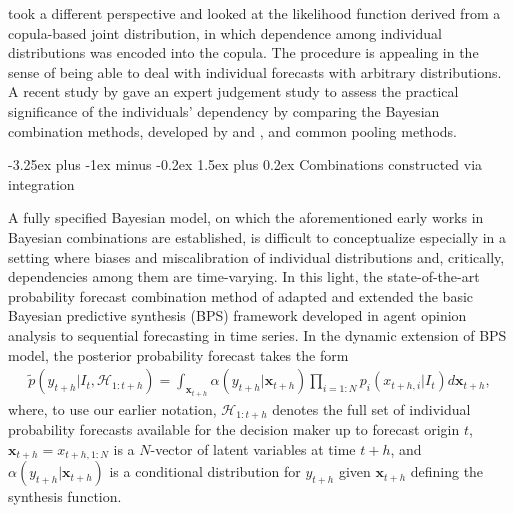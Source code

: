 \documentclass[11pt]{article}
\makeatletter
\renewcommand{\paragraph}{\@startsection{paragraph}{4}{0ex}%
   {-3.25ex plus -1ex minus -0.2ex}%
   {1.5ex plus 0.2ex}%
   {\normalfont\normalsize\bfseries}}
\makeatother
\begin{document}
\cite{Jouini1996-fe} took a different perspective and looked at the likelihood function derived from a copula-based joint distribution, in which dependence among individual distributions was encoded into the copula. The procedure is appealing in the sense of being able to deal with individual forecasts with arbitrary distributions. A recent study by \cite{Wilson2017-ct} gave an expert judgement study to assess the practical significance of the individuals' dependency by comparing the Bayesian combination methods, developed by \cite{Winkler1981-bn} and \cite{Jouini1996-fe}, and common pooling methods.

\paragraph{Combinations constructed via integration}

A fully specified Bayesian model, on which the aforementioned early works in Bayesian combinations are established, is difficult to conceptualize especially in a setting where biases and miscalibration of individual distributions and, critically, dependencies among them are time-varying. In this light, the state-of-the-art probability forecast combination method of \cite{McAlinn2019-kn} adapted and extended the basic Bayesian predictive synthesis (BPS) framework developed in agent opinion analysis \citep[see, e.g.,][]{Genest1985-bu,West1992-qy,West1992-gr} to sequential forecasting in time series. In the dynamic extension of BPS model, the posterior probability forecast takes the form
\begin{align*}
\tilde{p}\left(y_{t+h} | I_{t}, \mathcal{H}_{1: t+h}\right) = \int_{\boldsymbol{x}_{t+h}} \alpha\left(y_{t+h} | \boldsymbol{x}_{t+h}\right) \prod_{i=1: N} p_{i}\left(x_{t+h,i}|I_{t}\right) d \boldsymbol{x}_{t+h},
\end{align*}
where, to use our earlier notation, $\mathcal{H}_{1: t+h}$ denotes the full set of individual probability forecasts available for the decision maker up to forecast origin $t$, $\boldsymbol{x}_{t+h} = x_{t+h, 1:N}$ is a $N$-vector of latent variables at time $t+h$, and $\alpha\left(y_{t+h} | \boldsymbol{x}_{t+h}\right)$ is a conditional distribution for $y_{t+h}$ given $\boldsymbol{x}_{t+h}$ defining the synthesis function.
\end{document}
